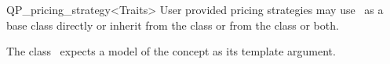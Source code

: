 \begin{ccRefClass}{QP_pricing_strategy<Traits>}
User provided pricing strategies may use \ccRefName\ as a base class directly
or inherit from the class  or from the class
 or both.   
   



\ccRequirements
\ccIndexRequirements

The class \ccRefName\ expects a model of the concept
 as its template argument.


\ccTypes \ccIndexClassTypes




\ccCreation
\ccIndexClassCreation
{}


\ccUnchecked

\ccAccessFunctions
\begin{ccIndexMemberFunctions}








\ccModifiers
{}



\end{ccIndexMemberFunctions}
\end{ccRefClass}
